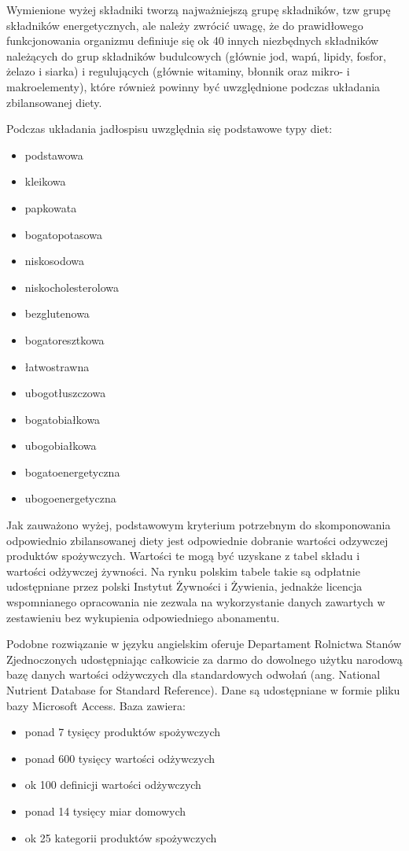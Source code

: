 Wymienione wyżej składniki tworzą najważniejszą grupę składników, tzw grupę składników energetycznych, ale należy zwrócić uwagę, że do prawidłowego funkcjonowania organizmu definiuje się ok 40 innych niezbędnych składników należących do grup składników budulcowych (głównie jod, wapń, lipidy, fosfor, żelazo i siarka) i regulujących (głównie witaminy, błonnik oraz mikro- i makroelementy), które również powinny być uwzględnione podczas układania zbilansowanej diety\cite{book:dietetyka-zywienie-zdroweg-i-chorego-czlowieka}.

\par
Podczas układania jadłospisu uwzględnia się podstawowe typy diet\cite{book:dietoterapia}:
\begin{itemize}
    \item podstawowa
    \item kleikowa
    \item papkowata
    \item bogatopotasowa
    \item niskosodowa
    \item niskocholesterolowa
    \item bezglutenowa
    \item bogatoresztkowa
    \item łatwostrawna
    \item ubogotłuszczowa
    \item bogatobiałkowa
    \item ubogobiałkowa
    \item bogatoenergetyczna
    \item ubogoenergetyczna
\end{itemize}

\par
Jak zauważono wyżej, podstawowym kryterium potrzebnym do skomponowania odpowiednio zbilansowanej diety jest odpowiednie dobranie wartości odzywczej produktów spożywczych.
Wartości te mogą być uzyskane z tabel składu i wartości odżywczej żywności.
Na rynku polskim tabele takie są odpłatnie udostępniane przez polski Instytut Żywności i Żywienia\cite{book:tabele-wartosci-odzywczych}, jednakże licencja wspomnianego opracowania nie zezwala na wykorzystanie danych zawartych w zestawieniu bez wykupienia odpowiedniego abonamentu\cite{url:izz-dostep-do-bazy}.

\par
Podobne rozwiązanie w języku angielskim oferuje Departament Rolnictwa Stanów Zjednoczonych udostępniając całkowicie za darmo do dowolnego użytku narodową bazę danych wartości odżywczych dla standardowych odwołań (ang. National Nutrient Database for Standard Reference)\cite{url:usda-sr-db}.
Dane są udostępniane w formie pliku bazy Microsoft Access. Baza zawiera:
\begin{itemize}
    \item ponad 7 tysięcy produktów spożywczych
    \item ponad 600 tysięcy wartości odżywczych
    \item ok 100 definicji wartości odżywczych
    \item ponad 14 tysięcy miar domowych
    \item ok 25 kategorii produktów spożywczych
\end{itemize}

\thispagestyle{normal}
